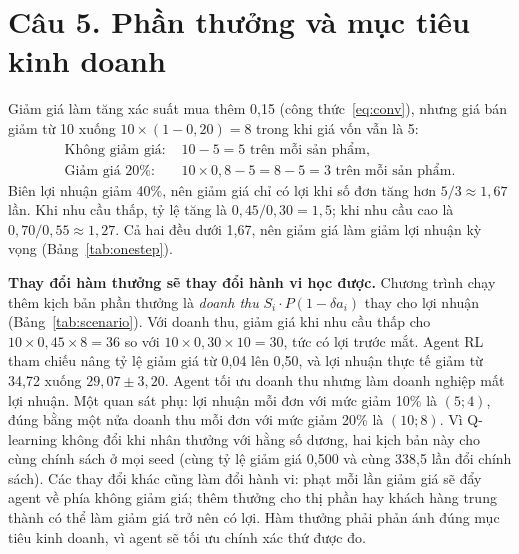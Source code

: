 \documentclass[12pt,a4paper]{report}
\begin{document}
\section*{Câu 5. Phần thưởng và mục tiêu kinh doanh}
Giảm giá làm tăng xác suất mua thêm 0{,}15 (công thức~\eqref{eq:conv}), nhưng giá
bán giảm từ 10 xuống $10\times(1-0{,}20)=8$ trong khi giá vốn vẫn là 5:
\begin{align*}
\text{Không giảm giá: } & 10-5=5 \text{ trên mỗi sản phẩm},\\
\text{Giảm giá 20\%: } & 10\times0{,}8-5=8-5=3 \text{ trên mỗi sản phẩm}.
\end{align*}
Biên lợi nhuận giảm 40\%, nên giảm giá chỉ có lợi khi số đơn tăng hơn
$5/3\approx1{,}67$ lần. Khi nhu cầu thấp, tỷ lệ tăng là $0{,}45/0{,}30=1{,}5$; khi
nhu cầu cao là $0{,}70/0{,}55\approx1{,}27$. Cả hai đều dưới 1{,}67, nên giảm giá
làm giảm lợi nhuận kỳ vọng (Bảng~\ref{tab:onestep}).

\textbf{Thay đổi hàm thưởng sẽ thay đổi hành vi học được.} Chương trình chạy thêm
kịch bản phần thưởng là \emph{doanh thu} $S_i\cdot P(1-\delta a_i)$ thay cho lợi
nhuận (Bảng~\ref{tab:scenario}). Với doanh thu, giảm giá khi nhu cầu thấp cho
$10\times0{,}45\times8=36$ so với $10\times0{,}30\times10=30$, tức có lợi trước mắt.
Agent RL tham chiếu nâng tỷ lệ giảm giá từ 0{,}04 lên 0{,}50, và lợi nhuận thực tế
giảm từ 34{,}72 xuống $29{,}07\pm3{,}20$. Agent tối ưu doanh thu nhưng làm doanh
nghiệp mất lợi nhuận. Một quan sát phụ: lợi nhuận mỗi đơn với mức giảm 10\% là
$(5;4)$, đúng bằng một nửa doanh thu mỗi đơn với mức giảm 20\% là $(10;8)$. Vì
Q-learning không đổi khi nhân thưởng với hằng số dương, hai kịch bản này cho cùng
chính sách ở mọi seed (cùng tỷ lệ giảm giá 0{,}500 và cùng 338{,}5 lần đổi chính
sách). Các thay đổi khác cũng làm đổi hành vi: phạt mỗi lần giảm giá sẽ đẩy agent
về phía không giảm giá; thêm thưởng cho thị phần hay khách hàng trung thành có thể
làm giảm giá trở nên có lợi. Hàm thưởng phải phản ánh đúng mục tiêu kinh doanh, vì
agent sẽ tối ưu chính xác thứ được đo.

\end{document}
